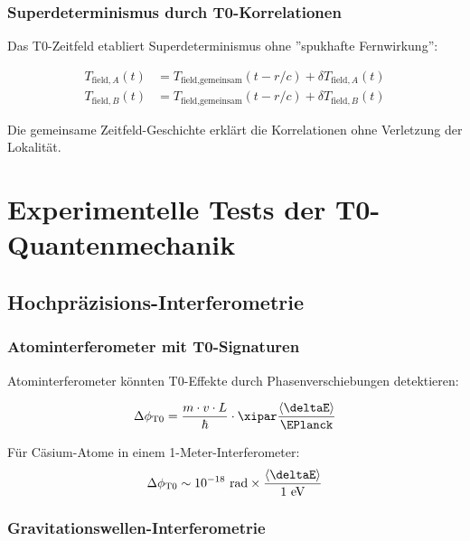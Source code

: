 	\subsubsection{Superdeterminismus durch T0-Korrelationen}
	
	Das T0-Zeitfeld etabliert Superdeterminismus ohne ''spukhafte Fernwirkung'':
	
	\begin{align}
		T_{\text{field},A}(t) &= T_{\text{field},\text{gemeinsam}}(t-r/c) + \delta T_{\text{field},A}(t) \\
		T_{\text{field},B}(t) &= T_{\text{field},\text{gemeinsam}}(t-r/c) + \delta T_{\text{field},B}(t)
	\end{align}
	
	Die gemeinsame Zeitfeld-Geschichte erklärt die Korrelationen ohne Verletzung der Lokalität.
	
	\section{Experimentelle Tests der T0-Quantenmechanik}
	
	\subsection{Hochpräzisions-Interferometrie}
	
	\subsubsection{Atominterferometer mit T0-Signaturen}
	
	Atominterferometer könnten T0-Effekte durch Phasenverschiebungen detektieren:
	
	\begin{equation}
		\Delta\phi_{\text{T0}} = \frac{m \cdot v \cdot L}{\hbar} \cdot \xipar \frac{\langle\deltaE\rangle}{\EPlanck}
	\end{equation}
	
	Für Cäsium-Atome in einem 1-Meter-Interferometer:
	\begin{equation}
		\Delta\phi_{\text{T0}} \sim 10^{-18} \text{ rad} \times \frac{\langle\deltaE\rangle}{1 \text{ eV}}
	\end{equation}
	
	\subsubsection{Gravitationswellen-Interferometrie}
	
